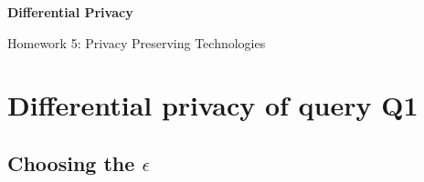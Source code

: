 \documentclass[parskip=half]{scrartcl}
\begin{document}


\begin{center}
    \Large
    \textsf{\textbf{Differential Privacy}}
        
    \vspace{0.4cm}
    \large
    Homework 5: Privacy Preserving Technologies
        
    \vspace{0.4cm}
    \docauthor{}
       
    \vspace{0.9cm}
\end{center}

\tableofcontents

\section{Differential privacy of query Q1}

\subsection{Choosing the \texorpdfstring{$\epsilon$}{ε}}
\end{document}
